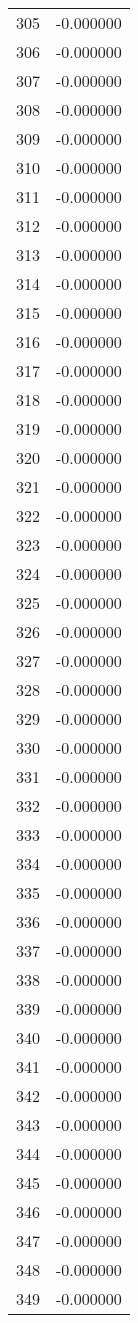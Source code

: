 \documentclass[12pt]{article}
\begin{document}
\begin{longtable}{@{}cc@{}}
305 & -0.000000 \\
306 & -0.000000 \\
307 & -0.000000 \\
308 & -0.000000 \\
309 & -0.000000 \\
310 & -0.000000 \\
311 & -0.000000 \\
312 & -0.000000 \\
313 & -0.000000 \\
314 & -0.000000 \\
315 & -0.000000 \\
316 & -0.000000 \\
317 & -0.000000 \\
318 & -0.000000 \\
319 & -0.000000 \\
320 & -0.000000 \\
321 & -0.000000 \\
322 & -0.000000 \\
323 & -0.000000 \\
324 & -0.000000 \\
325 & -0.000000 \\
326 & -0.000000 \\
327 & -0.000000 \\
328 & -0.000000 \\
329 & -0.000000 \\
330 & -0.000000 \\
331 & -0.000000 \\
332 & -0.000000 \\
333 & -0.000000 \\
334 & -0.000000 \\
335 & -0.000000 \\
336 & -0.000000 \\
337 & -0.000000 \\
338 & -0.000000 \\
339 & -0.000000 \\
340 & -0.000000 \\
341 & -0.000000 \\
342 & -0.000000 \\
343 & -0.000000 \\
344 & -0.000000 \\
345 & -0.000000 \\
346 & -0.000000 \\
347 & -0.000000 \\
348 & -0.000000 \\
349 & -0.000000 \\

\end{longtable}
\end{document}
